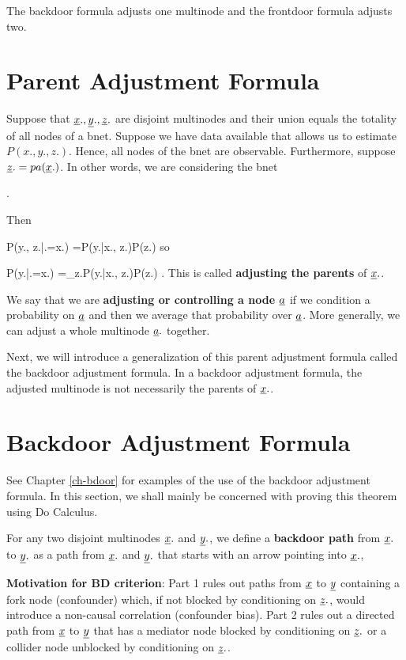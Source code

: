 The 
backdoor formula
adjusts one multinode
and the 
frontdoor formula adjusts two.

\section{Parent Adjustment Formula}


Suppose 
that ${\underline{x}}., {\underline{y}}., {\underline{z}}.$
are disjoint multinodes
and their union equals
 the
totality of all nodes of
a bnet. 
Suppose we have data
available that allows us  to
estimate $P(x., y., z.)$.
Hence, all nodes of the bnet
are observable.
Furthermore,
suppose ${\underline{z}}.=pa({\underline{x}}.)$.
In other words,
we are 
considering the bnet

\beq
{}
\;.
\eeq

Then

\beq
P(y., z.|\cald \rvx.=x.)
=P(y.|x., z.)P(z.)
\eeq
so

\beq
P(y.|\cald \rvx.=x.)
=\sum_{z.}P(y.|x., z.)P(z.)
\;.
\eeq
This is called
{\bf adjusting the parents}
of ${\underline{x}}.$.


We say that 
we are {\bf adjusting 
or controlling a node ${\underline{a}}$}
if we condition 
a probability on ${\underline{a}}$ and 
then we average 
that probability over ${\underline{a}}$.
More generally, 
we can adjust a whole
multinode ${\underline{a}}.$ together.

Next,
we will introduce 
a generalization
of 
this parent adjustment formula
called the 
backdoor adjustment formula.
In a backdoor adjustment formula,
the adjusted multinode
is not necessarily
 the parents of ${\underline{x}}.$.

\section{Backdoor Adjustment Formula}

See Chapter \ref{ch-bdoor}
for examples of the use of the 
backdoor adjustment formula.
In this section,
we shall mainly be
concerned with
proving this
theorem
using Do Calculus.

For any two
disjoint
multinodes ${\underline{x}}.$
and ${\underline{y}}.$,
we define a {\bf backdoor path}
from ${\underline{x}}.$ to ${\underline{y}}.$
as a path from ${\underline{x}}.$
and ${\underline{y}}.$ that
starts with an arrow pointing into 
${\underline{x}}.$,

\bdoordef

{\bf Motivation for BD criterion}: 
Part 1 rules out
paths 
from ${\underline{x}}$
to ${\underline{y}}$
containing a fork node (confounder)
which, if not blocked by conditioning on ${\underline{z}}.$, 
 would introduce a
non-causal correlation 
(confounder bias).
Part 2 rules out
a directed path
from ${\underline{x}}$ to ${\underline{y}}$
that has a mediator node
blocked by conditioning on ${\underline{z}}.$
or a collider node
unblocked by conditioning on ${\underline{z}}.$.



